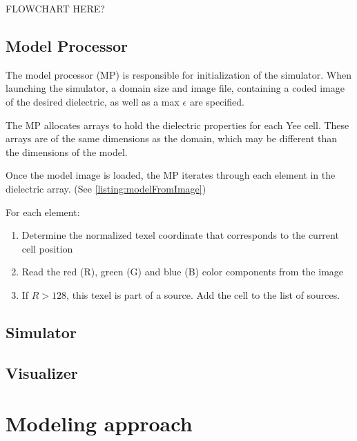 FLOWCHART HERE?

\subsection{Model Processor}\label{sec:modelProcessor}

The model processor (MP) is responsible for initialization of the simulator. When launching the simulator, a domain size and image file, containing a coded image of the desired dielectric, as well as a max $\epsilon$ are specified.

The MP allocates arrays to hold the dielectric properties for each Yee cell. These arrays are of the same dimensions as the domain, which may be different than the dimensions of the model. 

Once the model image is loaded, the MP iterates through each element in the dielectric array. (See \autoref{listing:modelFromImage})

For each element:

\begin{enumerate}
	\item Determine the normalized texel coordinate that corresponds to the current cell position	
	\item Read the red (R), green (G) and blue (B) color components from the image
	\item If $R > 128$, this texel is part of a source. Add the cell to the list of sources.
\end{enumerate}

\label{listing:modelFromImage}

\subsection{Simulator}\label{sec:simulator}
\subsection{Visualizer}\label{sec:visualizer}


\section{Modeling approach}
